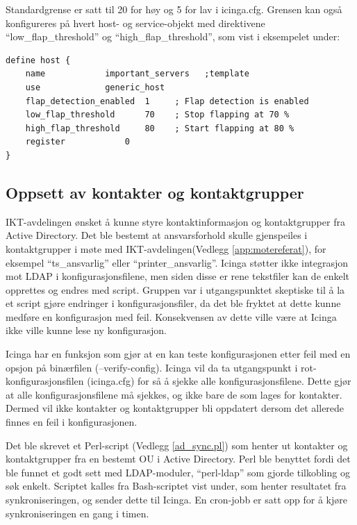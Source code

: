 Standardgrense er satt til 20 for høy og 5 for lav i icinga.cfg. Grensen kan også konfigureres på hvert host- og service-objekt med direktivene ``low\_flap\_threshold'' og ``high\_flap\_threshold'', som vist i eksempelet under:
\begin{lstlisting}[style=example]
define host {
    name 			important_servers  	;template
    use				generic_host
    flap_detection_enabled	1     ; Flap detection is enabled
    low_flap_threshold		70    ; Stop flapping at 70 %
    high_flap_threshold		80    ; Start flapping at 80 %
    register			0
}
\end{lstlisting}

\subsection{Oppsett av kontakter og kontaktgrupper}\label{sec:sync}
IKT-avdelingen ønsket å kunne styre kontaktinformasjon og kontaktgrupper fra Active Directory. Det ble bestemt at ansvarsforhold skulle gjenspeiles i kontaktgrupper i møte med IKT-avdelingen(Vedlegg \ref{app:motereferat}), for eksempel ``ts\_ansvarlig'' eller ``printer\_ansvarlig''. Icinga støtter ikke integrasjon mot LDAP i konfigurasjonsfilene, men siden disse er rene tekstfiler kan de enkelt opprettes og endres med script. Gruppen var i utgangspunktet skeptiske til å la et script gjøre endringer i konfigurasjonsfiler, da det ble fryktet at dette kunne medføre en konfigurasjon med feil. Konsekvensen av dette ville være at Icinga ikke ville kunne lese ny konfigurasjon.

Icinga har en funksjon som gjør at en kan teste konfigurasjonen etter feil med en opsjon på binærfilen (--verify-config). Icinga vil da ta utgangspunkt i rot-konfigurasjonsfilen (icinga.cfg) for så å sjekke alle konfigurasjonsfilene. Dette gjør at alle konfigurasjonsfilene må sjekkes, og ikke bare de som lages for kontakter. Dermed vil ikke kontakter og kontaktgrupper bli oppdatert dersom det allerede finnes en feil i konfigurasjonen. 

Det ble skrevet et Perl-script (Vedlegg \ref{ad_sync.pl}) som henter ut kontakter og kontaktgrupper fra en bestemt OU i Active Directory. Perl ble benyttet fordi det ble funnet et godt sett med LDAP-moduler, ``perl-ldap''\cite{perlldap} som gjorde tilkobling og søk enkelt. Scriptet kalles fra Bash-scriptet vist under, som henter resultatet fra synkroniseringen, og sender dette til Icinga. En cron-jobb er satt opp for å kjøre synkroniseringen en gang i timen.

